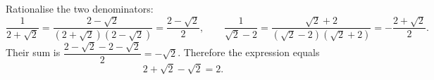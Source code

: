 Rationalise the two denominators:
\[\dfrac{1}{2+\sqrt2}=\dfrac{2-\sqrt2}{(2+\sqrt2)(2-\sqrt2)}=\dfrac{2-\sqrt2}{2},\qquad\dfrac{1}{\sqrt2-2}=\dfrac{\sqrt2+2}{(\sqrt2-2)(\sqrt2+2)}=-\dfrac{2+\sqrt2}{2}.\]
Their sum is $\dfrac{2-\sqrt2-2-\sqrt2}{2}=-\sqrt2$. Therefore the expression equals
\[2+\sqrt2-\sqrt2=\boxed{2}.\]
